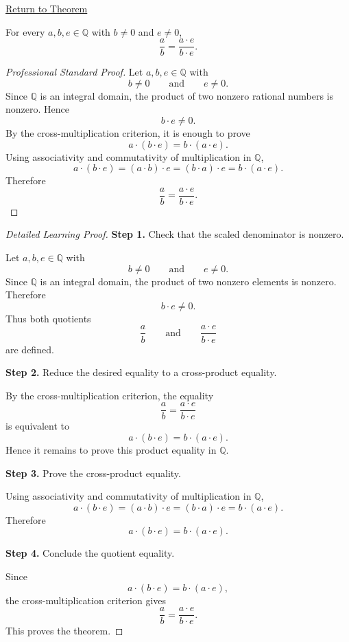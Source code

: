 \newpage
{}
\label{prf:rational-fraction-scaling}

\begin{remark*}[Return]
\hyperref[thm:rational-fraction-scaling]{Return to Theorem}
\end{remark*}

\begin{theorem*}
For every $a,b,e\in\mathbb{Q}$ with $b\neq 0$ and $e\neq 0$,
\[
\frac{a}{b}=\frac{a\cdot e}{b\cdot e}.
\]
\end{theorem*}

\begin{proof}[Professional Standard Proof]
\LRAProofBodyStart
Let $a,b,e\in\mathbb{Q}$ with
\[
b\neq 0
\qquad\text{and}\qquad
e\neq 0.
\]
Since $\mathbb{Q}$ is an integral domain, the product of two nonzero
rational numbers is nonzero. Hence
\[
b\cdot e\neq 0.
\]
By the cross-multiplication criterion, it is enough to prove
\[
a\cdot (b\cdot e)=b\cdot (a\cdot e).
\]
Using associativity and commutativity of multiplication in $\mathbb{Q}$,
\[
a\cdot (b\cdot e)
=
(a\cdot b)\cdot e
=
(b\cdot a)\cdot e
=
b\cdot (a\cdot e).
\]
Therefore
\[
\frac{a}{b}=\frac{a\cdot e}{b\cdot e}.
\]
\end{proof}

\begin{proof}[Detailed Learning Proof]
\LRAProofBodyStart

\textbf{Step 1.} Check that the scaled denominator is nonzero.

Let $a,b,e\in\mathbb{Q}$ with
\[
b\neq 0
\qquad\text{and}\qquad
e\neq 0.
\]
Since $\mathbb{Q}$ is an integral domain, the product of two nonzero
elements is nonzero. Therefore
\[
b\cdot e\neq 0.
\]
Thus both quotients
\[
\frac{a}{b}
\qquad\text{and}\qquad
\frac{a\cdot e}{b\cdot e}
\]
are defined.

\textbf{Step 2.} Reduce the desired equality to a cross-product equality.

By the cross-multiplication criterion, the equality
\[
\frac{a}{b}=\frac{a\cdot e}{b\cdot e}
\]
is equivalent to
\[
a\cdot (b\cdot e)=b\cdot (a\cdot e).
\]
Hence it remains to prove this product equality in $\mathbb{Q}$.

\textbf{Step 3.} Prove the cross-product equality.

Using associativity and commutativity of multiplication in $\mathbb{Q}$,
\[
a\cdot (b\cdot e)
=
(a\cdot b)\cdot e
=
(b\cdot a)\cdot e
=
b\cdot (a\cdot e).
\]
Therefore
\[
a\cdot (b\cdot e)=b\cdot (a\cdot e).
\]

\textbf{Step 4.} Conclude the quotient equality.

Since
\[
a\cdot (b\cdot e)=b\cdot (a\cdot e),
\]
the cross-multiplication criterion gives
\[
\frac{a}{b}=\frac{a\cdot e}{b\cdot e}.
\]
This proves the theorem.
\end{proof}

